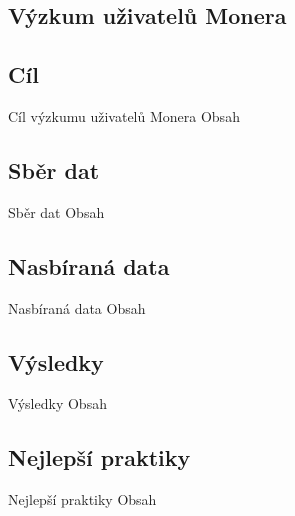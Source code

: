 \documentclass{beamer}
\begin{document}
    
   
  \begin{darkframes}
    \section{Výzkum uživatelů Monera}
    \subsection{Cíl}
    \begin{frame}{Cíl výzkumu uživatelů Monera}
     Obsah
    \end{frame}
    \subsection{Sběr dat}
    \begin{frame}{Sběr dat}
     Obsah
    \end{frame}
    \subsection{Nasbíraná data}
    \begin{frame}{Nasbíraná data}
     Obsah
    \end{frame}
    \subsection{Výsledky}
    \begin{frame}{Výsledky}
     Obsah
    \end{frame}
    \subsection{Nejlepší praktiky}
    \begin{frame}{Nejlepší praktiky}
     Obsah
    \end{frame}
  \end{darkframes}
  
    
\end{document}
